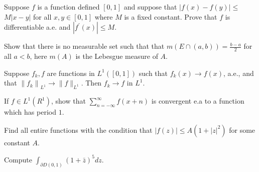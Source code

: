 \documentclass[14pt]{extarticle}
\begin{document}
Suppose $f$ is a function defined $[0,1]$ and suppose that $|f(x)-f(y)| \leq$ $M|x-y|$ for all $x, y \in[0,1]$ where $M$ is a fixed constant. Prove that $f$ is differentiable a.e. and $\left|f^{\prime}(x)\right| \leq M$.
\newpage

Show that there is no measurable set such that that $m(E \cap(a, b))=\frac{b-a}{2}$ for all $a<b$, here $m(A)$ is the Lebesgue measure of $A$.
\newpage

Suppose $f_{k}, f$ are functions in $L^{1}([0,1])$ such that $f_{k}(x) \rightarrow f(x)$, a.e., and that $\left\|f_{k}\right\|_{L^{1}} \rightarrow\|f\|_{L^{1}}$. Then $f_{k} \rightarrow f$ in $L^{1}$.
\newpage

If $f \in L^{1}\left(R^{1}\right)$, show that $\sum_{n=-\infty}^{\infty} f(x+n)$ is convergent e.a to a function which has period $1 .$

\newpage

Find all entire functions with the condition that $|f(z)| \leq A\left(1+|z|^{2}\right)$ for some constant $A$.
\newpage

Compute $\int_{\partial D(0,1)}(1+\bar{z})^{5} d z$.
\newpage
\end{document}
